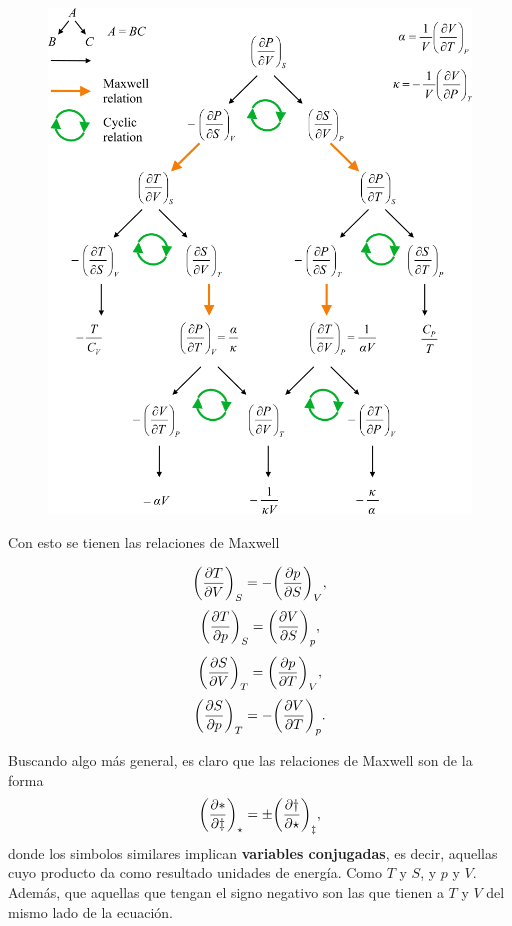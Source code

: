 	\begin{figure}[H]
		\centering
		\includegraphics[scale=0.3]{./img/maxwellRelations.png}
		\label{maxwellRelations}
	\end{figure}

Con esto se tienen las relaciones de Maxwell

	$$ \qty(\pdv{T}{V})_S = -\qty(\pdv{p}{S})_V, $$
	$$ \qty(\pdv{T}{p})_S = \qty(\pdv{V}{S})_p, $$
	$$ \qty(\pdv{S}{V})_T = \qty(\pdv{p}{T})_V, $$
	$$ \qty(\pdv{S}{p})_T = -\qty(\pdv{V}{T})_p. $$

Buscando algo más general, es claro que las relaciones de Maxwell son de la forma
	$$ \qty(\pdv{\ast}{\ddagger})_\star = \pm \qty(\pdv{\dagger}{\star})_\ddagger, $$
donde los simbolos similares implican \textbf{variables conjugadas}, es decir, aquellas cuyo producto da como resultado unidades de energía. Como $T$ y $S$, y $p$ y $V$. Además, que aquellas que tengan el signo negativo son las que tienen a $T$ y $V$ del mismo lado de la ecuación. \\

